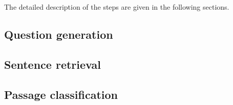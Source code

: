 The detailed description of the steps are given in the following sections.

\subsection{Question generation}


\subsection{Sentence retrieval}


\subsection{Passage classification}
